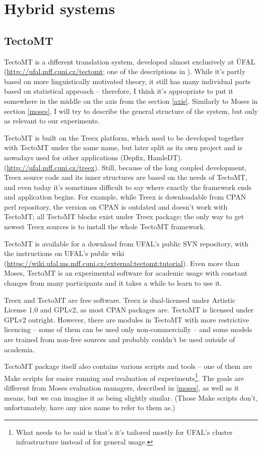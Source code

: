 \section{Hybrid systems}
\subsection{TectoMT}
\label{tecto}
TectoMT is a different translation system, developed almost exclusively at ÚFAL (\url{http://ufal.mff.cuni.cz/tectomt}; one of the descriptions in \cite{tmt_desc}). While it's partly based on more linguistically motivated theory, it still has many individual parts based on statistical approach -- therefore, I think it's appropriate to put it somewhere in the middle on the axis from the section \ref{axis}. Similarly to Moses in section \ref{moses}, I will try to describe the general structure of the system, but only as relevant to our experiments.

TectoMT is built on the Treex platform, which used to be developed together with TectoMT under the same name, but later split as its own project and is nowadays used for other applications (Depfix, HamleDT). (\url{http://ufal.mff.cuni.cz/treex}). 
Still, because of the long coupled development, Treex source code and its inner structures are based on the needs of TectoMT, and even today it's sometimes difficult to say where exactly the framework ends and application begins. For example, while Treex is downloadable from CPAN perl repository, the version on CPAN is outdated and doesn't work with TectoMT; all TectoMT blocks exist under Treex package; the only way to get newest Treex sources is to install the whole TectoMT framework.

TectoMT is available for a download from UFAL's public SVN repository, with the instructions on UFAL's public wiki (\url{https://wiki.ufal.ms.mff.cuni.cz/external:tectomt:tutorial}). Even more than Moses, TectoMT is an experimental software for academic usage with constant changes from many participants and it takes a while to learn to use it.

Treex and TectoMT are free software. Treex is dual-licensed under Artistic License 1.0 and GPLv2, as most CPAN packages are. TectoMT is licensed under GPLv2 outright. However, there are modules in TectoMT with more restrictive licencing -- some of them can be used only non-commercially -- and some models are trained from non-free sources and probably couldn't be used outside of academia. 

TectoMT package itself also contains various scripts and tools -- one of them are Make scripts for easier running and evaluation of experiments\footnote{What needs to be said is that's it's tailored mostly for UFAL's cluster infrastructure instead of for general usage.}. The goals are different from Moses evaluation managers, described in \ref{moses}, as well as it means, but we can imagine it as being slightly similar. (Those Make scripts don't, unfortunately, have any nice name to refer to them as.)

